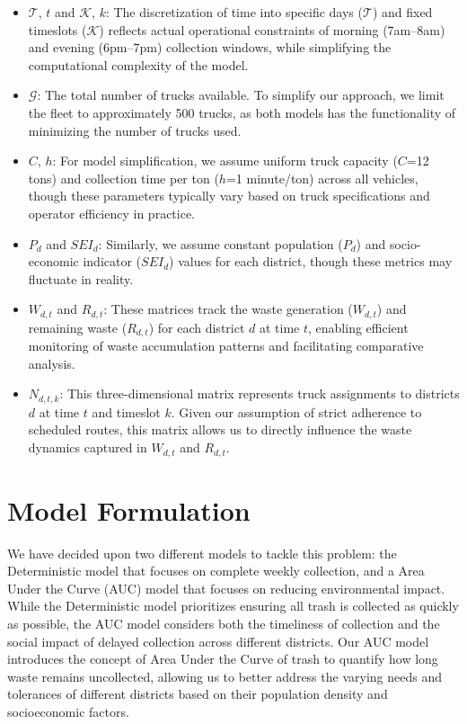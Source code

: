 \documentclass{article}
\begin{document}
\begin{itemize}
    \item $\mathcal{T}$, $t$ and $\mathcal{K}$, $k$: The discretization of time into specific days ($\mathcal{T}$) and fixed timeslots ($\mathcal{K}$) reflects actual operational constraints of morning (7am--8am) and evening (6pm--7pm) collection windows, while simplifying the computational complexity of the model.
    \item $\mathcal{G}$: The total number of trucks available. To simplify our approach, we limit the fleet to approximately 500 trucks, as both models has the functionality of minimizing the number of trucks used.
    \item $C$, $h$: For model simplification, we assume uniform truck capacity ($C$=12 tons) and collection time per ton ($h$=1 minute/ton) across all vehicles, though these parameters typically vary based on truck specifications and operator efficiency in practice.
    \item $P_d$ and $SEI_d$: Similarly, we assume constant population ($P_d$) and socio-economic indicator ($SEI_d$) values for each district, though these metrics may fluctuate in reality.
    \item $W_{d,t}$ and $R_{d,t}$: These matrices track the waste generation ($W_{d,t}$) and remaining waste ($R_{d,t}$) for each district $d$ at time $t$, enabling efficient monitoring of waste accumulation patterns and facilitating comparative analysis.
    \item $N_{d,t,k}$: This three-dimensional matrix represents truck assignments to districts $d$ at time $t$ and timeslot $k$. Given our assumption of strict adherence to scheduled routes, this matrix allows us to directly influence the waste dynamics captured in $W_{d,t}$ and $R_{d,t}$.

    
\end{itemize}

\section{Model Formulation}

We have decided upon two different models to tackle this problem: the Deterministic model that focuses on complete weekly collection, and a Area Under the Curve (AUC) model that focuses on reducing environmental impact. While the Deterministic model prioritizes ensuring all trash is collected as quickly as possible, the AUC model considers both the timeliness of collection and the social impact of delayed collection across different districts. Our AUC model introduces the concept of Area Under the Curve of trash to quantify how long waste remains uncollected, allowing us to better address the varying needs and tolerances of different districts based on their population density and socioeconomic factors.
\end{document}
